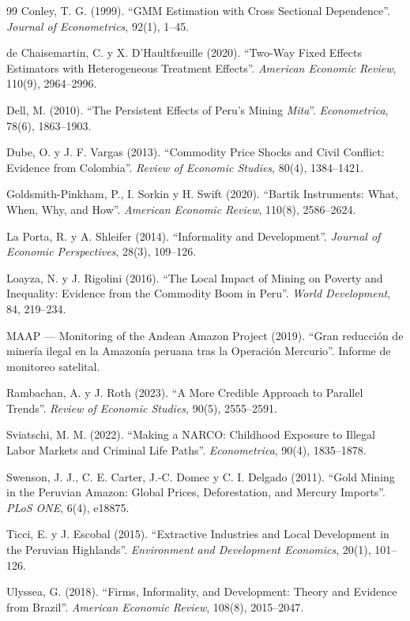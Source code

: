 \documentclass[11pt,a4paper]{article}
\begin{document}
\begin{thebibliography}{99}
Conley, T. G. (1999). ``GMM Estimation with Cross Sectional Dependence''. \emph{Journal of Econometrics}, 92(1), 1--45.

de Chaisemartin, C. y X. D'Haultf\oe uille (2020). ``Two-Way Fixed Effects Estimators with Heterogeneous Treatment Effects''. \emph{American Economic Review}, 110(9), 2964--2996.

Dell, M. (2010). ``The Persistent Effects of Peru's Mining \emph{Mita}''. \emph{Econometrica}, 78(6), 1863--1903.

Dube, O. y J. F. Vargas (2013). ``Commodity Price Shocks and Civil Conflict: Evidence from Colombia''. \emph{Review of Economic Studies}, 80(4), 1384--1421.

Goldsmith-Pinkham, P., I. Sorkin y H. Swift (2020). ``Bartik Instruments: What, When, Why, and How''. \emph{American Economic Review}, 110(8), 2586--2624.

La Porta, R. y A. Shleifer (2014). ``Informality and Development''. \emph{Journal of Economic Perspectives}, 28(3), 109--126.

Loayza, N. y J. Rigolini (2016). ``The Local Impact of Mining on Poverty and Inequality: Evidence from the Commodity Boom in Peru''. \emph{World Development}, 84, 219--234.

MAAP --- Monitoring of the Andean Amazon Project (2019). ``Gran reducción de minería ilegal en la Amazonía peruana tras la Operación Mercurio''. Informe de monitoreo satelital.

Rambachan, A. y J. Roth (2023). ``A More Credible Approach to Parallel Trends''. \emph{Review of Economic Studies}, 90(5), 2555--2591.

Sviatschi, M. M. (2022). ``Making a NARCO: Childhood Exposure to Illegal Labor Markets and Criminal Life Paths''. \emph{Econometrica}, 90(4), 1835--1878.

Swenson, J. J., C. E. Carter, J.-C. Domec y C. I. Delgado (2011). ``Gold Mining in the Peruvian Amazon: Global Prices, Deforestation, and Mercury Imports''. \emph{PLoS ONE}, 6(4), e18875.

Ticci, E. y J. Escobal (2015). ``Extractive Industries and Local Development in the Peruvian Highlands''. \emph{Environment and Development Economics}, 20(1), 101--126.

Ulyssea, G. (2018). ``Firms, Informality, and Development: Theory and Evidence from Brazil''. \emph{American Economic Review}, 108(8), 2015--2047.

\end{thebibliography}
\end{document}
